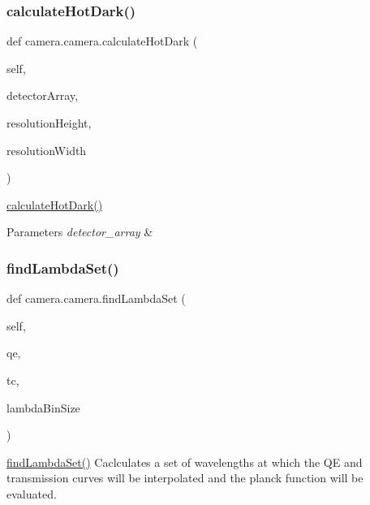 \subsubsection{\texorpdfstring{calculate\+Hot\+Dark()}{calculateHotDark()}}
{\footnotesize\ttfamily def camera.\+camera.\+calculate\+Hot\+Dark (\begin{DoxyParamCaption}\item[{}]{self,  }\item[{}]{detector\+Array,  }\item[{}]{resolution\+Height,  }\item[{}]{resolution\+Width }\end{DoxyParamCaption})}



\hyperlink{classcamera_1_1camera_ad4aee85257a01b49869bf21a4ce6f7f8}{calculate\+Hot\+Dark()} 


\begin{DoxyParams}{Parameters}
{\em detector\+\_\+array} & \\
\hline
\end{DoxyParams}
\mbox{\label{classcamera_1_1camera_aeec423a87b32526d88ca5db5c662a462}} 
\subsubsection{\texorpdfstring{find\+Lambda\+Set()}{findLambdaSet()}}
{\footnotesize\ttfamily def camera.\+camera.\+find\+Lambda\+Set (\begin{DoxyParamCaption}\item[{}]{self,  }\item[{}]{qe,  }\item[{}]{tc,  }\item[{}]{lambda\+Bin\+Size }\end{DoxyParamCaption})}



\hyperlink{classcamera_1_1camera_aeec423a87b32526d88ca5db5c662a462}{find\+Lambda\+Set()} Caclculates a set of wavelengths at which the QE and transmission curves will be interpolated and the planck function will be evaluated. 


